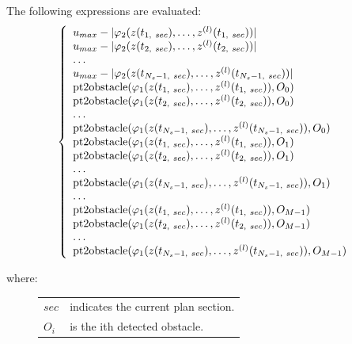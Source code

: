 \documentclass[letterpaper,10pt,english]{sphinxmanual}
\begin{document}
\begin{fulllineitems}
\begin{fulllineitems}
The following expressions are evaluated:
\begin{gather}
\begin{split}\left\lbrace\begin{array}{lcl}
u_{max} - |\varphi_2(z(t_{1,\ sec}),\dotsc,z^{(l)}(t_{1,\ sec}))|\\
u_{max} - |\varphi_2(z(t_{2,\ sec}),\dotsc,z^{(l)}(t_{2,\ sec}))|\\
\dotsc\\
u_{max} - |\varphi_2(z(t_{N_s-1,\ sec}),\dotsc,z^{(l)}(t_{N_s-1,\ sec}))|\\
\mathrm{pt2obstacle}(\varphi_1(z(t_{1,\ sec}),\dotsc,z^{(l)}(t_{1,\ sec})), O_0)\\
\mathrm{pt2obstacle}(\varphi_1(z(t_{2,\ sec}),\dotsc,z^{(l)}(t_{2,\ sec})), O_0)\\
\dotsc\\
\mathrm{pt2obstacle}(\varphi_1(z(t_{N_s-1,\ sec}),
\dotsc,z^{(l)}(t_{N_s-1,\ sec})), O_0)\\
\mathrm{pt2obstacle}(\varphi_1(z(t_{1,\ sec}),\dotsc,z^{(l)}(t_{1,\ sec})), O_1)\\
\mathrm{pt2obstacle}(\varphi_1(z(t_{2,\ sec}),\dotsc,z^{(l)}(t_{2,\ sec})), O_1)\\
\dotsc\\
\mathrm{pt2obstacle}(\varphi_1(z(t_{N_s-1,\ sec}),
\dotsc,z^{(l)}(t_{N_s-1,\ sec})), O_1)\\
\dotsc\\
\mathrm{pt2obstacle}(\varphi_1(z(t_{1,\ sec}),
\dotsc,z^{(l)}(t_{1,\ sec})), O_{M-1})\\
\mathrm{pt2obstacle}(\varphi_1(z(t_{2,\ sec}),
\dotsc,z^{(l)}(t_{2,\ sec})), O_{M-1})\\
\dotsc\\
\mathrm{pt2obstacle}(\varphi_1(z(t_{N_s-1,\ sec}),
\dotsc,z^{(l)}(t_{N_s-1,\ sec})), O_{M-1})\\
\end{array}\right.\end{split}\notag
\end{gather}\begin{description}
\item[{where:}] \leavevmode
\begin{tabulary}{\linewidth}{|L|L|}
\hline

\(sec\)
 & 
indicates the current plan section.
\\

\(O_i\)
 & 
is the ith detected obstacle.
\\


\end{tabulary}
\end{description}
\end{fulllineitems}
\end{fulllineitems}
\end{document}
